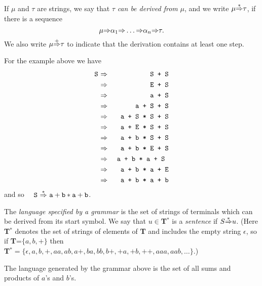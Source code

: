 If $\mu$ and $\tau$ are strings,
we say that  $\tau$ {\em can be derived from} $\mu$,
and we write $\mu{\mathop{\Rightarrow}\limits^*}\tau$, if there is a sequence
$$
\mu{\mathop{\Rightarrow}\limits^{}}\alpha_1{\mathop{\Rightarrow}\limits^{}}\ldots{\mathop{\Rightarrow}\limits^{}}\alpha_n{\mathop{\Rightarrow}\limits^{}}\tau.
$$
We also write $\mu{\mathop{\Rightarrow}\limits^{+}}\tau$ to indicate that the derivation
contains at least one step.

For the example above we have
\label{p_derive}
\begin{eqnarray*}
\mbox{\tt
S} &{\ \mathop{\Rightarrow}\limits^{}\ }& \mbox{\tt S + S} \\
  &{\ \mathop{\Rightarrow}\limits^{}\ }& \mbox{\tt E + S} \\
  &{\ \mathop{\Rightarrow}\limits^{}\ }& \mbox{\tt a + S} \\
  &{\ \mathop{\Rightarrow}\limits^{}\ }& \mbox{\tt a + S + S} \\
  &{\ \mathop{\Rightarrow}\limits^{}\ }& \mbox{\tt a + S * S + S}\\ 
  &{\ \mathop{\Rightarrow}\limits^{}\ }& \mbox{\tt a + E * S + S}\\ 
  &{\ \mathop{\Rightarrow}\limits^{}\ }& \mbox{\tt a + b * S + S} \\
  &{\ \mathop{\Rightarrow}\limits^{}\ }& \mbox{\tt a + b * E + S} \\
  &{\ \mathop{\Rightarrow}\limits^{}\ }& \mbox{\tt a + b * a + S }\\
  &{\ \mathop{\Rightarrow}\limits^{}\ }& \mbox{\tt a + b * a + E} \\
  &{\ \mathop{\Rightarrow}\limits^{}\ }& \mbox{\tt a + b * a + b} \\
\end{eqnarray*}
and so \ \ ${\tt S}\ \derive\ {\tt a + b * a + b}$.

The {\em language specified by a grammar} is the set of strings
of terminals which can be derived from its start symbol.
We say that $u\in${\bf T}$^*$ is a {\em sentence} if $S{\mathop{\Rightarrow}\limits^*} u$.
(Here {\bf T}$^*$ denotes the set of strings of elements of {\bf T}
and includes the empty string $\epsilon$, so if {\bf T}=$\{a, b, +\}$ 
then \\
{\bf T}$^* = \{\epsilon, a, b, +, aa, ab, a+, ba, bb, b+, +a, +b, ++,
aaa, aab, \ldots\}$.)

The language generated by the grammar above is the set of all sums
and products of $a$'s and $b$'s.


